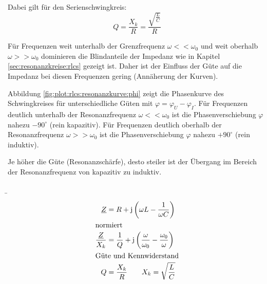 \begin{frame}[t]
{Dabei gilt für den Serienschwingkreis:
\begin{equation}
    Q = \frac{X_k}{R} = \frac{\sqrt{\frac{L}{C}}}{R}
\end{equation}

Für Frequenzen weit unterhalb der Grenzfrequenz $\omega << \omega_0$ und weit oberhalb $\omega >> \omega_0$
dominieren die Blindanteile der Impedanz wie in Kapitel \ref{sec:resonanzkreise:rlcs} gezeigt ist. 
Daher ist der Einfluss der Güte auf die Impedanz bei diesen Frequenzen gering (Annäherung der Kurven).


Abbildung \ref{fig:plot:rlcs:resonanzkurve:phi} zeigt die Phasenkurve des Schwingkreises für unterschiedliche Güten mit $\varphi = \varphi_U - \varphi_I$.
Für Frequenzen deutlich unterhalb der Resonanzfrequenz $\omega << \omega_0$ ist die Phasenverschiebung $\varphi$ nahezu $-90^\circ$ (rein kapazitiv).
Für Frequenzen deutlich oberhalb der Resonanzfrequenz $\omega >> \omega_0$ ist die Phasenverschiebung $\varphi$ nahezu $+90^\circ$ (rein induktiv).

Je höher die Güte (Resonanzschärfe), desto steiler ist der Übergang im Bereich der Resonanzfrequenz von kapazitiv zu induktiv.
}%
\b{%
\begin{minipage}{0.3\textwidth}%
\begin{align*}
    \underline{Z} &= R + \mathrm{j}\left(\omega L - \frac{1}{\omega C}\right)\\
        \intertext{normiert}
    \frac{\underline{Z}}{X_k} &= \frac{1}{Q} + \mathrm{j}\left(\frac{\omega}{\omega_0} - \frac{\omega_0}{\omega}\right)\\
        \intertext{Güte und Kennwiderstand}
    Q &= \frac{X_k}{R} \qquad X_k = \sqrt{\frac{L}{C}}
\end{align*}
\end{minipage}\hfill%
\begin{minipage}{0.65\textwidth}\centering
\end{minipage}
}%
\end{frame}

